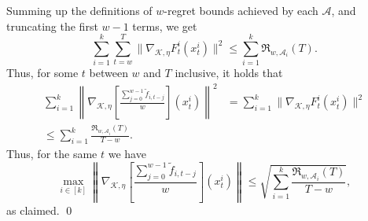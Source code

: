 \documentclass{article}
\def\norm#1{\mathopen\| #1 \mathclose\|}
\newcommand{\K}{\ensuremath{\mathcal K}}
\newcommand{\bra}[1]{\left[#1\right]}
\renewcommand{\K}{\mathcal{K}}
\newcommand{\Acal}{\mathcal{A}}
\newcommand{\regret}{\mathfrak{R}}
\begin{document}
\begin{appendix}
Summing up the definitions of $w$-regret bounds achieved by each $\Acal$, and truncating the first $w-1$ terms, we get
\begin{equation*}
\sum_{i=1}^k \sum_{t=w}^T \norm{ \nabla_{\K, \eta} F_t^i(x_t^i) }^2 \leq \sum_{i=1}^k \regret_{w,\Acal_i}(T).
\end{equation*}
Thus, for some $t$ between $w$ and $T$ inclusive, it holds that
\begin{align*}
\sum_{i=1}^k \left\lVert \nabla_{\K, \eta} \bra{ \frac{ \sum_{j=0}^{w-1} \tilde f_{i,t-j} }{w}}(x_t^i) \right\rVert ^2
&=
\sum_{i=1}^k \norm{ \nabla_{\K, \eta} F_t^i(x_t^i) }^2 \\
\leq
\sum_{i=1}^k \frac{\regret_{w,\Acal_i}(T)}{T - w}.
\end{align*}
Thus, for the same $t$ we have
\begin{equation*}
\max_{i\in [k]} \left\lVert \nabla_{\K, \eta} \bra{ \frac{ \sum_{j=0}^{w-1} \tilde f_{i,t-j} }{w}}(x_t^i) \right\rVert
\leq
\sqrt{\sum_{i=1}^k \frac{\regret_{w,\Acal_i}(T)}{T - w}},
\end{equation*}
as claimed.
\qed
 
\end{appendix}
\end{document}

